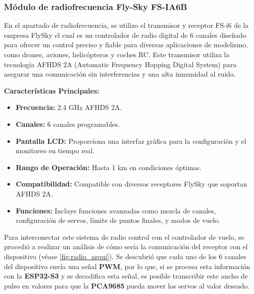    \subsubsection{Módulo de radiofrecuencia Fly-Sky FS-IA6B}

        En el apartado de radiofrecuencia, se utilizo el transmisor y receptor FS-i6 de la empresa FlySky el cual es un controlador de radio digital de 6 canales diseñado para ofrecer un control preciso y fiable para diversas aplicaciones de modelismo, como drones, aviones, helicópteros y coches RC. Este transmisor utiliza la tecnología AFHDS 2A (Automatic Frequency Hopping Digital System) para asegurar una comunicación sin interferencias y una alta inmunidad al ruido. \cite{flysky}

        \textbf{Características Principales:}
        \begin{itemize}
            \item \textbf{Frecuencia:} 2.4 GHz AFHDS 2A.
            \item \textbf{Canales:} 6 canales programables.
            \item \textbf{Pantalla LCD:} Proporciona una interfaz gráfica para la configuración y el monitoreo en tiempo real.\cite{19}
            \item \textbf{Rango de Operación:} Hasta 1 km en condiciones óptimas.\cite{19}
            \item \textbf{Compatibilidad:} Compatible con diversos receptores FlySky que soportan AFHDS 2A.\cite{flysky}
            \item \textbf{Funciones:} Incluye funciones avanzadas como mezcla de canales, configuración de servos, límite de puntos finales, y modos de vuelo.   \cite{flysky}
        \end{itemize}

        Para interconectar este sistema de radio control con el controlador de vuelo, se procedió a realizar un análisis de cómo sería la comunicación del receptor con el dispositivo (véase \ref{fig:radio_arqui}). Se descubrió que cada uno de los 6 canales del dispositivo envía una señal \textbf{PWM}, por lo que, si se procesa esta información con la \textbf{ESP32-S3} y se decodifica esta señal, es posible transcribir este ancho de pulso en valores para que la \textbf{PCA9685} pueda mover los servos al valor deseado.


